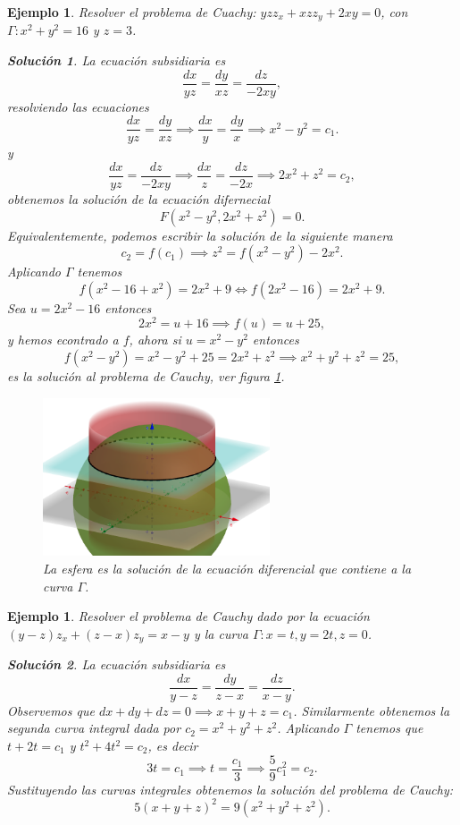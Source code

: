 \documentclass[11pt,letterpaper,draft]{report}
\newtheorem{example}[defn]{Ejemplo}
\newtheorem*{sol}{Solución}
\newcommand\<{\langle}
\renewcommand\>{\rangle}
\begin{document}
\begin{example}
  Resolver el problema de Cuachy: $yz z_x + xz z_y + 2xy =
  0$, con $\Gamma : x^2 + y^2 = 16$ y $z = 3$.
  \begin{sol}
    La ecuación subsidiaria es
    \[
    \frac{dx}{yz} = \frac{dy}{xz} = \frac{dz}{-2xy},
    \] 
    resolviendo las ecuaciones
    \[
    \frac{dx}{yz} = \frac{dy}{xz} \implies \frac{dx}{y} =
    \frac{dy}{x} \implies x^2 - y^2 = c_1.
    \]
    y
    \[
    \frac{dx}{yz} = \frac{dz}{-2xy} \implies \frac{dx}{z} =
    \frac{dz}{-2x} \implies 2x^2 + z^2 = c_2,
    \] 
    obtenemos la solución de la ecuación difernecial
    \[
    F(x^2 - y^2, 2x^2 + z^2) = 0.
    \] 
    Equivalentemente, podemos escribir la solución de la
    siguiente manera
    \[
    c_2 = f(c_1) \implies z^2 = f(x^2-y^2) - 2x^2.
    \] 
    Aplicando $\Gamma$ tenemos
    \[
    f(x^2 - 16 + x^2) = 2x^2 + 9 \iff f(2x^2 - 16) = 2x^2 +
    9.
    \]
    Sea $u = 2x^2 - 16$ entonces
    \[
    2x^2 = u + 16 \implies f(u) = u + 25,
    \] 
    y hemos econtrado a $f$, ahora si $u = x^2 - y^2$
    entonces
    \[
    f(x^2-y^2) = x^2-y^2 + 25 = 2x^2 + z^2 \implies x^2 +
    y^2 + z^2 = 25,
    \] 
    es la solución al problema de Cauchy, ver figura
    \ref{fig:cauchy-esfera-ejemplo}.
    \begin{figure}[ht]
      \centering
      \includegraphics[width=0.6\textwidth]{imgs/cauchy-esfera.png}
      \caption{La esfera es la solución de la ecuación
      diferencial que contiene a la curva $\Gamma$.}
      \label{fig:cauchy-esfera-ejemplo}
    \end{figure}
  \end{sol}
\end{example}

\begin{example}
  Resolver el problema de Cauchy dado por la ecuación
  $(y-z)z_x + (z-x)z_y = x-y$ y la curva $\Gamma : x = t, y
  = 2t, z = 0$.
  \begin{sol}
    La ecuación subsidiaria es
    \[
    \frac{dx}{y-z} = \frac{dy}{z-x} = \frac{dz}{x-y}.
    \] 
    Observemos que $dx + dy + dz = 0 \implies x + y + z =
    c_1$. Similarmente obtenemos la segunda curva integral
    dada por $c_2 = x^2 + y^2 + z^2$. Aplicando $\Gamma$ 
    tenemos que $t + 2t = c_1$ y $t^2 + 4t^2 = c_2$, es
    decir
    \[
    3t = c_1 \implies t = \frac{c_1}{3} \implies
    \frac{5}{9}c_1^2 = c_2.
    \] 
    Sustituyendo las curvas integrales obtenemos la
    solución del problema de Cauchy:
    \[
    5(x+y+z)^2 = 9(x^2+y^2+z^2).
    \] 
  \end{sol}
\end{example}
\end{document}
